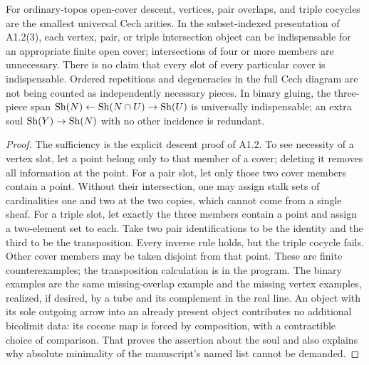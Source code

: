 \begin{result}\label{A1.4}
For ordinary-topos open-cover descent, vertices, pair overlaps, and triple
cocycles are the smallest universal Cech arities. In the subset-indexed
presentation of A1.2(3), each vertex, pair, or triple intersection object
can be indispensable for an appropriate finite open cover;
intersections of four or more members are unnecessary. There is no
claim that every slot of every particular cover is indispensable.
Ordered repetitions and degeneracies in the full Cech diagram are not
being counted as independently necessary pieces.
In binary gluing, the three-piece span
$\operatorname{Sh}(N)\leftarrow\operatorname{Sh}(N\cap U)\to\operatorname{Sh}(U)$ is universally indispensable;
an extra soul $\operatorname{Sh}(Y)\to\operatorname{Sh}(N)$ with no other incidence is redundant.
\end{result}
\begin{proof}
The sufficiency is the explicit descent proof of A1.2. To see necessity
of a vertex slot, let a point belong only to that member of a cover;
deleting it removes all information at the point. For a pair slot, let
only those two cover members contain a point. Without their intersection,
one may assign stalk sets of cardinalities one and two at the two copies,
which cannot come from a single sheaf. For a triple slot, let exactly the
three members contain a point and assign a two-element set to each.
Take two pair identifications to be the identity and the third to be the
transposition. Every inverse rule holds, but the triple cocycle fails.
Other cover members may be taken disjoint from that point. These are
finite counterexamples; the transposition calculation is in the program.
The binary examples are the same missing-overlap example and the missing
vertex examples, realized, if desired, by a tube and its complement in
the real line. An object with its sole outgoing arrow into an already
present object contributes no additional bicolimit data: its cocone map
is forced by composition, with a contractible choice of comparison.
That proves the assertion about the soul and also explains why absolute
minimality of the manuscript's named list cannot be demanded.
\end{proof}

